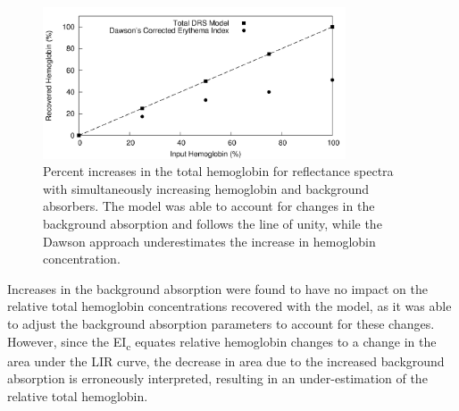\begin{figure}
	\centering \includegraphics[width=0.8\textwidth]{figures/p3-bkg_changes.png}
	\caption[Hemoglobin recovery with changing background absorber concentrations]{\label{fig:p3-bkg_changes}Percent increases in the total hemoglobin for reflectance spectra with simultaneously increasing hemoglobin and background absorbers. The model was able to account for changes in the background absorption and follows the line of unity, while the Dawson approach underestimates the increase in hemoglobin concentration.}
\end{figure}

Increases in the background absorption were found to have no impact on the relative total hemoglobin concentrations recovered with the model, as it was able to adjust the background absorption parameters to account for these changes. However, since the EI\textsubscript{c} equates relative hemoglobin changes to a change in the area under the LIR curve, the decrease in area due to the increased background absorption is erroneously interpreted, resulting in an under-estimation of the relative total hemoglobin.

